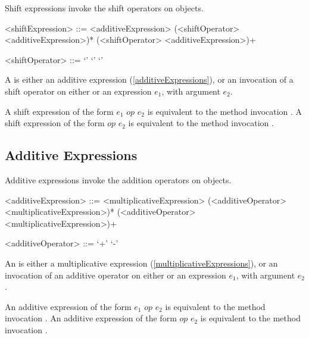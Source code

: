 \documentclass[makeidx]{article}
\begin{document}
{\LMHash{}%
Shift expressions invoke the shift operators on objects.

\begin{grammar}
<shiftExpression> ::= \gnewline{}
  <additiveExpression> (<shiftOperator> <additiveExpression>)*
  \alt \SUPER{} (<shiftOperator> <additiveExpression>)+

<shiftOperator> ::= `\ltlt'
  \alt `\gtgt'
  \alt `\gtgtgt'
\end{grammar}

\LMHash{}%
A  is either an additive expression (\ref{additiveExpressions}), or an invocation of a shift operator on either \SUPER{} or an expression $e_1$, with argument $e_2$.

\LMHash{}%
A shift expression of the form $e_1$ $op$ $e_2$ is equivalent to the method invocation .
A shift expression of the form \SUPER{} $op$ $e_2$ is equivalent to the method invocation .



\subsection{Additive Expressions}

\LMHash{}%
Additive expressions invoke the addition operators on objects.

\begin{grammar}
<additiveExpression> ::= <multiplicativeExpression>
  \gnewline{} (<additiveOperator> <multiplicativeExpression>)*
  \alt \SUPER{} (<additiveOperator> <multiplicativeExpression>)+

<additiveOperator> ::= `+'
  \alt `-'
\end{grammar}

\LMHash{}%
An  is either a multiplicative expression (\ref{multiplicativeExpressions}), or an invocation of an additive operator on either \SUPER{} or an expression $e_1$, with argument $e_2$.

\LMHash{}%
An additive expression of the form $e_1$ $op$ $e_2$ is equivalent to the method invocation .
An additive expression of the form \SUPER{} $op$ $e_2$ is equivalent to the method invocation .

}
\end{document}
